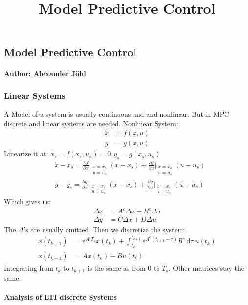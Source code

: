 \documentclass[a4paper,landscape,8pt,fleqn]{scrartcl}
\title{Model Predictive Control} %
\newcommand{\de}[1]{~\mathrm{d}#1}
\newcommand{\deidei}[2]{\frac{\partial#1}{\partial#2}}
\newcommand{\derivat}[2][]{#1|_{#2}} %
\begin{document}
\begin{multicols}{3}
\part*{Model Predictive Control}
\subsection*{Author: Alexander J\"{o}hl}
\section{Linear Systems}
A Model of a system is usually continuous and and nonlinear. But in MPC discrete and linear systems are needed. Nonlinear System:
\begin{align*}
	\dot{x} &= f(x,u) \\
	y &= g(x,u)
\end{align*}
Linearize it at: $\dot{x}_s = f(x_s,u_x) = 0, y_s = g(x_s,u_s)$
\begin{align*}
	&\dot{x} - \dot{x}_s = \deidei{f}{x}\derivat[\bigg]{\substack{x = x_s \\ u = u_s}} (x - x_s) + \deidei{f}{u}\derivat[\bigg]{\substack{x = x_s \\ u = u_s}} (u-u_s) \\
	&y-y_s = \deidei{g}{x}\derivat[\bigg]{\substack{x = x_s \\ u = u_s}} (x - x_s) + \deidei{g}{u}\derivat[\bigg]{\substack{x = x_s\\ u = u_s}} (u - u_s)
\end{align*}
Which gives us:
\begin{align*}
	\Delta \dot{x} &= A^c \Delta x + B^c \Delta u \\
	\Delta y &= C \Delta x + D \Delta u 
\end{align*}
The $\Delta$'s are usually omitted. Then we discretize the system:
\begin{align*}
	x(t_{k+1}) &= e^{A^c T_s} x(t_k) + \int_{t_k}^{t_{k+1}}e^{A^c (t_{k+1}-\tau)}B^c \de\tau ~u(t_k) \\ x(t_{k+1}) &= A x(t_k) + B u(t_k)
\end{align*}
Integrating from $t_k$ to $t_{k+1}$ is the same as from $0$ to $T_s$. Other matrices stay the same.

\subsection{Analysis of LTI discrete Systems}

\end{multicols}
\end{document}
